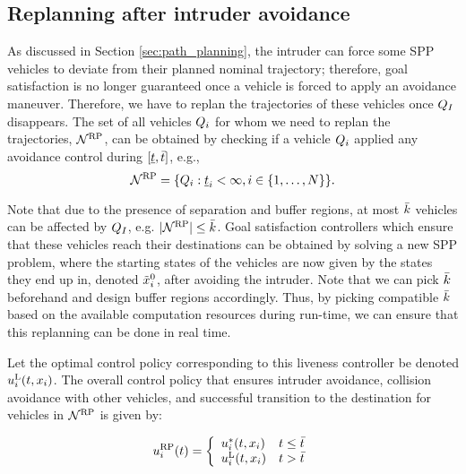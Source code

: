 \subsection{Replanning after intruder avoidance} \label{sec:replan}
As discussed in Section \ref{sec:path_planning}, the intruder can force some SPP vehicles to deviate from their planned nominal trajectory; therefore, goal satisfaction is no longer guaranteed once a vehicle is forced to apply an avoidance maneuver. Therefore, we have to replan the trajectories of these vehicles once $Q_{I}$ disappears. The set of all vehicles $Q_i$ for whom we need to replan the trajectories, $\mathcal{N}^\text{RP}$, can be obtained by checking if a vehicle $Q_i$ applied any avoidance control during $[\underline{t}, \bar{t}]$, e.g.,
\begin{equation} \label{eq:RVS}
\rvs = \{\veh_i: \tsa_i < \infty, i \in \{1, \ldots, \N \} \}. 
\end{equation}  

Note that due to the presence of separation and buffer regions, at most $\bar{k}$ vehicles can be affected by $Q_{I}$, e.g. $|\mathcal{N}^\text{RP}| \leq \bar{k}$. Goal satisfaction controllers which ensure that these vehicles reach their destinations can be obtained by solving a new SPP problem, where the starting states of the vehicles are now given by the states they end up in, denoted $\tilde{x}_i^0$, after avoiding the intruder. Note that we can pick $\bar{k}$ beforehand and design buffer regions accordingly. Thus, by picking compatible $\bar{k}$ based on the available computation resources during run-time, we can ensure that this replanning can be done in real time. 

Let the optimal control policy corresponding to this liveness controller be denoted ${u^{\text{L}}_{i}}(t, x_i)$. The overall control policy that ensures intruder avoidance, collision avoidance with other vehicles, and successful transition to the destination for vehicles in $\mathcal{N}^\text{RP}$ is given by:

\begin{equation*}
u_i^{\text{RP}}(t) = 
\left \{ 
\begin{array}{ll}
{u^*_{i}}(t, x_i) & t \leq \bar{t}\\
{u^{\text{L}}_{i}}(t, x_i) & t > \bar{t}
\end{array}
\right.
\end{equation*}

